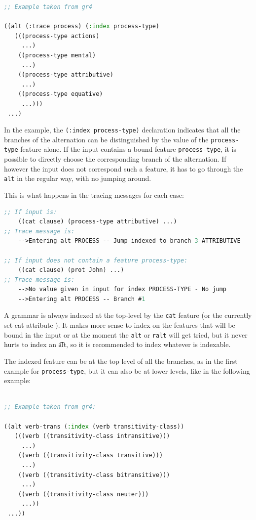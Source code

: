 \documentclass[10pt,a4paper]{report}
\begin{document}
\begin{lstlisting}[language=Lisp]
;; Example taken from gr4

((alt (:trace process) (:index process-type)
   (((process-type actions)
     ...)
    ((process-type mental)
     ...)
    ((process-type attributive)
     ...)
    ((process-type equative)
     ...)))
 ...)
\end{lstlisting}

In the example, the {\tt (:index process-type)} declaration
indicates that all the branches of the alternation can be
distinguished by the value of the {\tt process-type} feature alone.
If the input contains a bound feature {\tt process-type}, it is
possible to directly choose the corresponding branch of the
alternation. If however the input does not correspond such a
feature, it has to go through the {\tt alt} in the regular way, with no
jumping around. 

This is what happens in the tracing messages for each case:

\begin{lstlisting}[language=Lisp]
;; If input is:      
    ((cat clause) (process-type attributive) ...)
;; Trace message is: 
    -->Entering alt PROCESS -- Jump indexed to branch 3 ATTRIBUTIVE

;; If input does not contain a feature process-type:
    ((cat clause) (prot John) ...)
;; Trace message is:
    -->No value given in input for index PROCESS-TYPE - No jump
    -->Entering alt PROCESS -- Branch #1
\end{lstlisting}

A grammar is always indexed at the top-level by the {\tt cat} feature (or
the currently set cat attribute ). It makes more
sense to index on the features that will be bound in the input or at the
moment the {\tt alt} or {\tt ralt} will get tried, but it never hurts to index
an \t {alt}, so it is recommended to index whatever is indexable.

The indexed feature can be at the top level of all the branches,
as in the first example for {\tt process-type}, but it can also be
at lower levels, like in the following example:

\begin{lstlisting}[language=Lisp]

;; Example taken from gr4:

((alt verb-trans (:index (verb transitivity-class))
   (((verb ((transitivity-class intransitive)))
     ...)
    ((verb ((transitivity-class transitive)))
     ...)
    ((verb ((transitivity-class bitransitive)))
     ...)
    ((verb ((transitivity-class neuter)))
     ...))
 ...))

\end{lstlisting}
\end{document}
